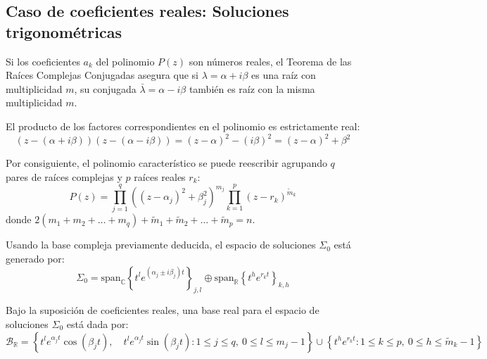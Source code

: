 \subsection{Caso de coeficientes reales: Soluciones trigonométricas}

Si los coeficientes $a_k$ del polinomio $P(z)$ son números reales, el Teorema de las Raíces Complejas Conjugadas asegura que si $\lambda = \alpha + i\beta$ es una raíz con multiplicidad $m$, su conjugada $\bar{\lambda} = \alpha - i\beta$ también es raíz con la misma multiplicidad $m$.

El producto de los factores correspondientes en el polinomio es estrictamente real:
\[
    (z - (\alpha + i\beta))(z - (\alpha - i\beta)) = (z - \alpha)^2 - (i\beta)^2 = (z - \alpha)^2 + \beta^2
\]

Por consiguiente, el polinomio característico se puede reescribir agrupando $q$ pares de raíces complejas y $p$ raíces reales $r_k$:
\[
    P(z) = \prod_{j=1}^q \left( (z - \alpha_j)^2 + \beta_j^2 \right)^{m_j} \prod_{k=1}^p (z - r_k)^{\tilde{m}_k}
\]
donde $2(m_1 + m_2 + \dots + m_q) + \tilde{m}_1 + \tilde{m}_2 + \dots + \tilde{m}_p = n$.

Usando la base compleja previamente deducida, el espacio de soluciones $\Sigma_0$ está generado por:
\[
    \Sigma_0 = \text{span}_{\mathbb{C}} \left\{ t^l e^{(\alpha_j \pm i \beta_j)t} \right\}_{j,l} \oplus \text{span}_{\mathbb{R}} \left\{ t^h e^{r_k t} \right\}_{k,h}
\]

\begin{corolario}
    Bajo la suposición de coeficientes reales, una base real para el espacio de soluciones $\Sigma_0$ está dada por:
    \[
        \mathcal{B}_{\mathbb{R}} = \left\{ t^l e^{\alpha_j t}\cos(\beta_j t), \quad t^l e^{\alpha_j t} \sin(\beta_j t) : 1 \leq j \leq q, \ 0 \leq l \leq m_j - 1 \right\} \cup \left\{ t^h e^{r_k t} : 1 \leq k \leq p, \ 0 \leq h \leq \tilde{m}_k - 1 \right\}
    \]
\end{corolario}

